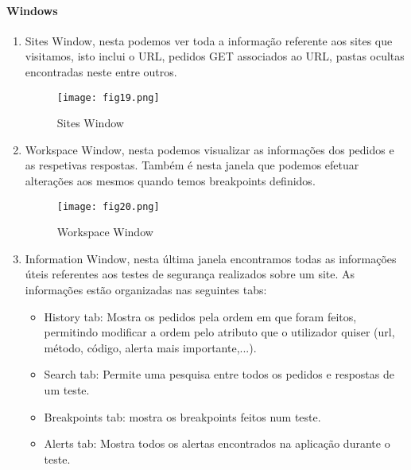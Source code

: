 \paragraph{Windows} \hfill\newline
\hfill\newline
\begin{enumerate}

\item Sites Window, nesta podemos ver toda a informação referente aos sites que visitamos, isto inclui o URL, pedidos GET associados ao URL, pastas ocultas encontradas neste entre outros.

\begin{figure}[H]

  \centering

  \texttt{[image: fig19.png]}

  \caption{Sites Window}

\end{figure}

\item Workspace Window, nesta podemos visualizar as informações dos pedidos e as respetivas respostas. Também é nesta janela que podemos efetuar alterações aos mesmos quando temos breakpoints definidos.

\begin{figure}[H]

  \centering

  \texttt{[image: fig20.png]}

  \caption{Workspace Window}

\end{figure}

\item Information Window, nesta última janela encontramos todas as informações úteis referentes aos testes de segurança realizados sobre um site. As informações estão organizadas nas seguintes tabs:
\begin{itemize}
	\item History tab: Mostra os pedidos pela ordem em que foram feitos, permitindo modificar a ordem pelo atributo que o utilizador quiser (url, método, código, alerta mais importante,...).
	\item Search tab: Permite uma pesquisa entre todos os pedidos e respostas de um teste.

	\item Breakpoints tab: mostra os breakpoints feitos num teste.

	\item Alerts tab: Mostra todos os alertas encontrados na aplicação durante o teste.


\end{itemize}
\end{enumerate}

